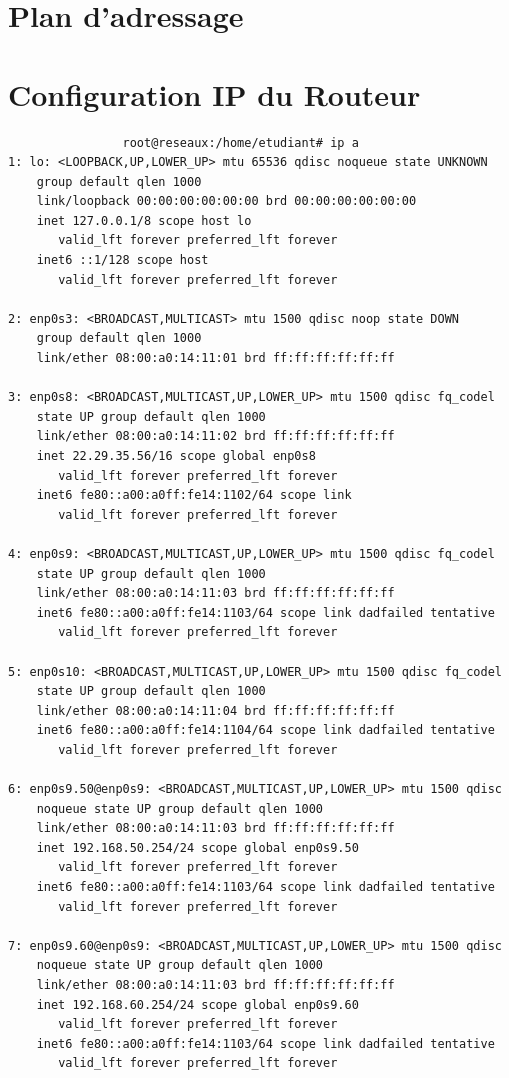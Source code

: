 \documentclass[a4paper,12pt]{report}
\begin{document}
        \section{Plan d'adressage}

        \section{Configuration IP du Routeur}
            \begin{verbatim}
                root@reseaux:/home/etudiant# ip a
1: lo: <LOOPBACK,UP,LOWER_UP> mtu 65536 qdisc noqueue state UNKNOWN 
    group default qlen 1000
    link/loopback 00:00:00:00:00:00 brd 00:00:00:00:00:00
    inet 127.0.0.1/8 scope host lo
       valid_lft forever preferred_lft forever
    inet6 ::1/128 scope host 
       valid_lft forever preferred_lft forever

2: enp0s3: <BROADCAST,MULTICAST> mtu 1500 qdisc noop state DOWN 
    group default qlen 1000
    link/ether 08:00:a0:14:11:01 brd ff:ff:ff:ff:ff:ff

3: enp0s8: <BROADCAST,MULTICAST,UP,LOWER_UP> mtu 1500 qdisc fq_codel 
    state UP group default qlen 1000
    link/ether 08:00:a0:14:11:02 brd ff:ff:ff:ff:ff:ff
    inet 22.29.35.56/16 scope global enp0s8
       valid_lft forever preferred_lft forever
    inet6 fe80::a00:a0ff:fe14:1102/64 scope link 
       valid_lft forever preferred_lft forever

4: enp0s9: <BROADCAST,MULTICAST,UP,LOWER_UP> mtu 1500 qdisc fq_codel 
    state UP group default qlen 1000
    link/ether 08:00:a0:14:11:03 brd ff:ff:ff:ff:ff:ff
    inet6 fe80::a00:a0ff:fe14:1103/64 scope link dadfailed tentative 
       valid_lft forever preferred_lft forever

5: enp0s10: <BROADCAST,MULTICAST,UP,LOWER_UP> mtu 1500 qdisc fq_codel 
    state UP group default qlen 1000
    link/ether 08:00:a0:14:11:04 brd ff:ff:ff:ff:ff:ff
    inet6 fe80::a00:a0ff:fe14:1104/64 scope link dadfailed tentative 
       valid_lft forever preferred_lft forever

6: enp0s9.50@enp0s9: <BROADCAST,MULTICAST,UP,LOWER_UP> mtu 1500 qdisc 
    noqueue state UP group default qlen 1000
    link/ether 08:00:a0:14:11:03 brd ff:ff:ff:ff:ff:ff
    inet 192.168.50.254/24 scope global enp0s9.50
       valid_lft forever preferred_lft forever
    inet6 fe80::a00:a0ff:fe14:1103/64 scope link dadfailed tentative 
       valid_lft forever preferred_lft forever

7: enp0s9.60@enp0s9: <BROADCAST,MULTICAST,UP,LOWER_UP> mtu 1500 qdisc 
    noqueue state UP group default qlen 1000
    link/ether 08:00:a0:14:11:03 brd ff:ff:ff:ff:ff:ff
    inet 192.168.60.254/24 scope global enp0s9.60
       valid_lft forever preferred_lft forever
    inet6 fe80::a00:a0ff:fe14:1103/64 scope link dadfailed tentative 
       valid_lft forever preferred_lft forever


\end{verbatim}
\end{document}
